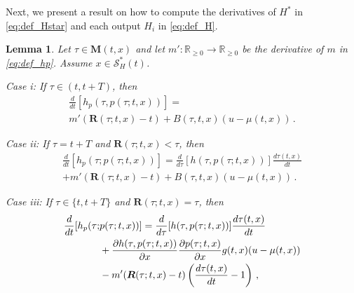 \documentclass[10pt,conference]{ieeeconf}
\renewcommand{\(}{\left(}
\renewcommand{\)}{\right)}
\renewcommand{\[}{\left[}
\renewcommand{\]}{\right]}
\newcommand{\reals}{\mathbb{R}}
\newtheorem{lemma}{Lemma}
\begin{document}
Next, we present a result on how to compute the derivatives of $H^*$ in \eqref{eq:def_Hstar} and each output ${H}_i$ in \eqref{eq:def_H}.

\begin{lemma}%
\label{lemma:computing}
Let $\tau \in \boldsymbol{M}(t,x)$ %
and let $m':\reals_{\geq0}\rightarrow\reals_{\geq0}$ be the derivative of $m$ in \eqref{eq:def_hp}. Assume $x \in \mathcal{S}_H^*(t)$. 

\emph{Case i:} If $\tau \in (t,t+T)$, then
\vspace{-2pt}
\begin{multline}
\frac{d}{dt}[h_p(\tau, p(\tau; t, x))] = \\ m'(\boldsymbol{R}(\tau;t,x)-t) + B(\tau,t,x) (u - \mu(t,x)) \,. \label{eq:computational_theorem}
\end{multline}

\emph{Case ii:}
If $\tau = t+T$ and $\boldsymbol{R}(\tau;t,x) < \tau$, then 
\vspace{-2pt}
\begin{multline}
    \frac{d}{dt}[h_p(\tau;p(\tau;t,x))] = \frac{d}{d\tau}[h(\tau,p(\tau;t,x))] \frac{d \tau(t,x)}{dt} \\ + m'(\boldsymbol{R}(\tau;t,x)-t) + B(\tau,t,x)(u - \mu(t,x)) \,. \label{eq:computational_theorem2}
\end{multline}

\emph{Case iii:}
If $\tau \in \{t, t+T\}$ and $\boldsymbol{R}(\tau;t,x) = \tau$, then
\begin{align}
    \frac{d}{dt}[h_p(\tau;&p(\tau;t,x))] = \frac{d}{d\tau}[h(\tau,p(\tau;t,x))] \frac{d \tau(t,x)}{dt} \nonumber  \\ & + \frac{\partial h(\tau,p(\tau;t,x))}{\partial x}\frac{\partial p(\tau;t,x)}{\partial x} g(t,x)(u - \mu(t,x)) \nonumber \\ & -m'(\boldsymbol{R}(\tau;t,x) - t) \left( \frac{d \tau(t,x)}{dt} - 1\right) \,, \label{eq:computational_theorem3} \hspace{-4pt}
\end{align}
\vspace{-12pt}


\end{lemma}
\end{document}
